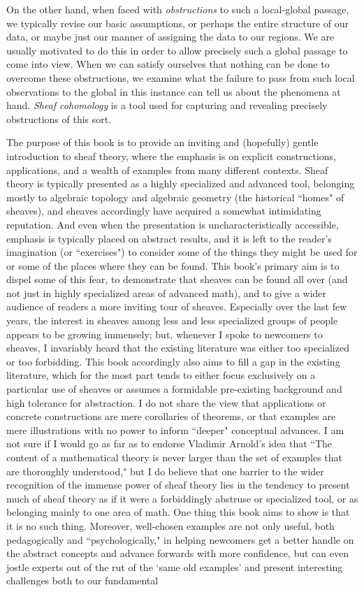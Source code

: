 \documentclass[11pt]{book}
\theoremstyle{definition}
\theoremstyle{definition}
\theoremstyle{definition}
\theoremstyle{theorem}
\theoremstyle{definition}
\begin{document}
	On the other hand, when faced with \textit{obstructions} to such a local-global passage, we typically revise our basic assumptions, or perhaps the entire structure of our data, or maybe just our manner of assigning the data to our regions. We are usually motivated to do this in order to allow precisely such a global passage to come into view. When we can satisfy ourselves that nothing can be done to overcome these obstructions, we examine what the failure to pass from such local observations to the global in this instance can tell us about the phenomena at hand. \textit{Sheaf cohomology} is a tool used for capturing and revealing precisely obstructions of this sort. \par     
	The purpose of this book is to provide an inviting and (hopefully) gentle introduction to sheaf theory, where the emphasis is on explicit constructions, applications, and a wealth of examples from many different contexts. Sheaf theory is typically presented as a highly specialized and advanced tool, belonging mostly to algebraic topology and algebraic geometry (the historical ``homes" of sheaves), and sheaves accordingly have acquired a somewhat intimidating reputation. And even when the presentation is uncharacteristically accessible, emphasis is typically placed on abstract results, and it is left to the reader's imagination (or ``exercises") to consider some of the things they might be used for or some of the places where they can be found. This book's primary aim is to dispel some of this fear, to demonstrate that sheaves can be found all over (and not just in highly specialized areas of advanced math), and to give a wider audience of readers a more inviting tour of sheaves. Especially over the last few years, the interest in sheaves among less and less specialized groups of people appears to be growing immensely; but, whenever I spoke to newcomers to sheaves, I invariably heard that the existing literature was either too specialized or too forbidding. This book accordingly also aims to fill a gap in the existing literature, which for the most part tends to either focus exclusively on a particular use of sheaves or assumes a formidable pre-existing background and high tolerance for abstraction. I do not share the view that applications or concrete constructions are mere corollaries of theorems, or that examples are mere illustrations with no power to inform ``deeper" conceptual advances. I am not sure if I would go as far as to endorse Vladimir Arnold's  idea that ``The content of a mathematical theory is never larger than the set of examples that are thoroughly understood," but I do believe that one barrier to the wider recognition of the immense power of sheaf theory lies in the tendency to present much of sheaf theory as if it were a forbiddingly abstruse or specialized tool, or as belonging mainly to one area of math. One thing this book aims to show is that it is no such thing. Moreover, well-chosen examples are not only useful, both pedagogically and ``psychologically," in helping newcomers get a better handle on the abstract concepts and advance forwards with more confidence, but can even jostle experts out of the rut of the `same old examples' and present interesting challenges both to our fundamental 
\end{document}
